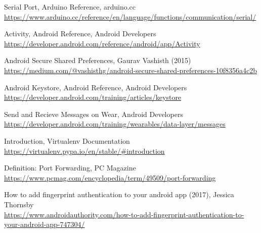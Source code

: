 \begin{thebibliography}{99}
Serial Port, Arduino Reference, arduino.cc\\
\url{https://www.arduino.cc/reference/en/language/functions/communication/serial/}

Activity, Android Reference, Android Developers\\
\url{https://developer.android.com/reference/android/app/Activity}

Android Secure Shared Preferences, Gaurav Vashisth (2015)\\
\url{https://medium.com/@vashisthg/android-secure-shared-preferences-10f8356a4c2b}

Android Keystore, Android Reference, Android Developers\\
\url{https://developer.android.com/training/articles/keystore}

Send and Recieve Messages on Wear, Android Developers\\
\url{https://developer.android.com/training/wearables/data-layer/messages}

Introduction, Virtualenv Documentation\\
\url{https://virtualenv.pypa.io/en/stable/#introduction}

Definition: Port Forwarding, PC Magazine\\
\url{https://www.pcmag.com/encyclopedia/term/49509/port-forwarding}

How to add fingerprint authentication to your android app (2017), Jessica Thornsby\\
\url{https://www.androidauthority.com/how-to-add-fingerprint-authentication-to-your-android-app-747304/}

\end{thebibliography}